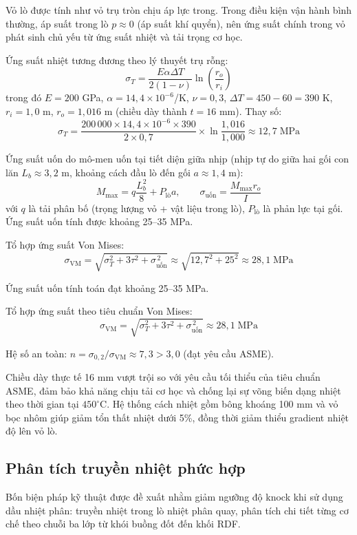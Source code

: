 \documentclass[../main.tex]{subfiles}
\begin{document}
Vỏ lò được tính như vỏ trụ tròn chịu áp lực trong. Trong điều kiện vận hành bình thường, áp suất trong lò $p \approx 0$ (áp suất khí quyển), nên ứng suất chính trong vỏ phát sinh chủ yếu từ ứng suất nhiệt và tải trọng cơ học.

Ứng suất nhiệt tương đương theo lý thuyết trụ rỗng:
\begin{equation}
\sigma_T = \frac{E \alpha \Delta T}{2(1 - \nu)} \ln\!\left(\frac{r_o}{r_i}\right)
\label{eq:ust-nhiet-vo-lo}
\end{equation}
trong đó $E = 200$ GPa, $\alpha = 14{,}4 \times 10^{-6}$/K, $\nu = 0{,}3$, $\Delta T = 450 - 60 = 390$ K, $r_i = 1{,}0$ m, $r_o = 1{,}016$ m (chiều dày thành $t = 16$ mm). Thay số:
\[
\sigma_T = \frac{200\,000 \times 14{,}4 \times 10^{-6} \times 390}{2 \times 0{,}7} \times \ln\!\frac{1{,}016}{1{,}000}
\approx 12{,}7 \;\text{MPa}
\]

Ứng suất uốn do mô-men uốn tại tiết diện giữa nhịp (nhịp tự do giữa hai gối con lăn $L_b \approx 3{,}2$ m, khoảng cách đầu lò đến gối $a \approx 1{,}4$ m):
\begin{equation}
M_{\max} = q \frac{L_b^2}{8} + P_{\text{lò}} a, \qquad
\sigma_{\text{uốn}} = \frac{M_{\max} r_o}{I}
\label{eq:uon-vo-lo}
\end{equation}
với $q$ là tải phân bố (trọng lượng vỏ + vật liệu trong lò), $P_{\text{lò}}$ là phản lực tại gối. Ứng suất uốn tính được khoảng 25--35 MPa.

Tổ hợp ứng suất Von Mises:
\[
\sigma_{\text{VM}} = \sqrt{\sigma_T^2 + 3\tau^2 + \sigma_{\text{uốn}}^{\,2}}
\approx \sqrt{12{,}7^2 + 25^2} \approx 28{,}1 \;\text{MPa}
\]

Ứng suất uốn tính toán đạt khoảng 25--35 MPa.

Tổ hợp ứng suất theo tiêu chuẩn Von Mises:
\[
\sigma_{\text{VM}} = \sqrt{\sigma_T^2 + 3\tau^2 + \sigma_{\text{uốn}}^{\,2}} \approx 28{,}1 \;\text{MPa}
\]

Hệ số an toàn: $n = \sigma_{0,2}/\sigma_{\text{VM}} \approx 7{,}3 > 3{,}0$ (đạt yêu cầu ASME).

Chiều dày thực tế 16 mm vượt trội so với yêu cầu tối thiểu của tiêu chuẩn ASME, đảm bảo khả năng chịu tải cơ học và chống lại sự võng biến dạng nhiệt theo thời gian tại $450^\circ\mathrm{C}$. Hệ thống cách nhiệt gồm bông khoáng 100 mm và vỏ bọc nhôm giúp giảm tổn thất nhiệt dưới 5\%, đồng thời giảm thiểu gradient nhiệt độ lên vỏ lò.

\subsection{Phân tích truyền nhiệt phức hợp}
\label{sec:truyen-nhiet-phuc-hop-va-thiet-ke-lo}
Bốn biện pháp kỹ thuật được đề xuất nhằm giảm ngưỡng độ knock khi sử dụng dầu nhiệt phân: truyền nhiệt trong lò nhiệt phân quay, phân tích chi tiết từng cơ chế theo chuỗi ba lớp từ khói buồng đốt đến khối RDF.
\end{document}
